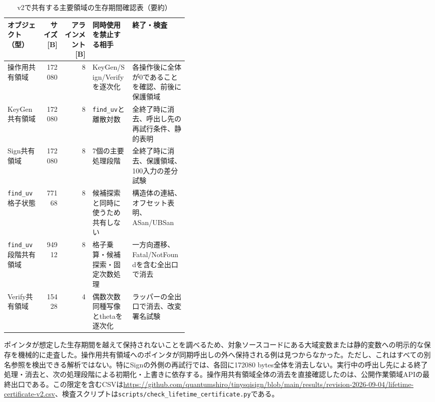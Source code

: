 \documentclass[a4paper,10pt]{ltjsarticle}
\theoremstyle{definition}
\theoremstyle{remark}
\begin{document}
\begin{table}[H]
  \centering
  \caption{v2で共有する主要領域の生存期間確認表（要約）}
  \label{tab:lifetime-certificate}
  \scriptsize
  \begin{tabularx}{\linewidth}{@{}p{0.20\linewidth}r r p{0.22\linewidth}X@{}}
    \toprule
    オブジェクト（型） & サイズ [B] & アラインメント [B] & 同時使用を禁止する相手 & 終了・検査 \\
    \midrule
    操作用共有領域 & \num{172080} & 8 & KeyGen/Sign/Verifyを逐次化 & 各操作後に全体が0であることを確認、前後に保護領域 \\
    KeyGen共有領域 & \num{172080} & 8 & \texttt{find\_uv}と離散対数 & 全終了時に消去、呼出し先の再試行条件、静的表明 \\
    Sign共有領域 & \num{172080} & 8 & 7個の主要処理段階 & 全終了時に消去、保護領域、100入力の差分試験 \\
    \texttt{find\_uv}格子状態 & \num{77168} & 8 & 候補探索と同時に使うため共有しない & 構造体の連結、オフセット表明、ASan/UBSan \\
    \texttt{find\_uv}段階共有領域 & \num{94912} & 8 & 格子乗算・候補探索・固定次数処理 & 一方向遷移、Fatal/NotFoundを含む全出口で消去 \\
    Verify共有領域 & \num{15428} & 4 & 偶数次数同種写像とthetaを逐次化 & ラッパーの全出口で消去、改変署名試験 \\
    \bottomrule
  \end{tabularx}
\end{table}

ポインタが想定した生存期間を越えて保持されないことを調べるため、対象ソースコードにある大域変数または静的変数への明示的な保存を機械的に走査した。操作用共有領域へのポインタが同期呼出しの外へ保持される例は見つからなかった。ただし、これはすべての別名参照を検出できる解析ではない。特にSignの外側の再試行では、各回に\num{172080} bytes全体を消去しない。実行中の呼出し先による終了処理・消去と、次の処理段階による初期化・上書きに依存する。操作用共有領域全体の消去を直接確認したのは、公開作業領域APIの最終出口である。この限定を含むCSVは\url{https://github.com/quantumshiro/tinysqisign/blob/main/results/revision-2026-09-04/lifetime-certificate-v2.csv}、検査スクリプトは\texttt{scripts/check\_lifetime\_certificate.py}である。
\end{document}
